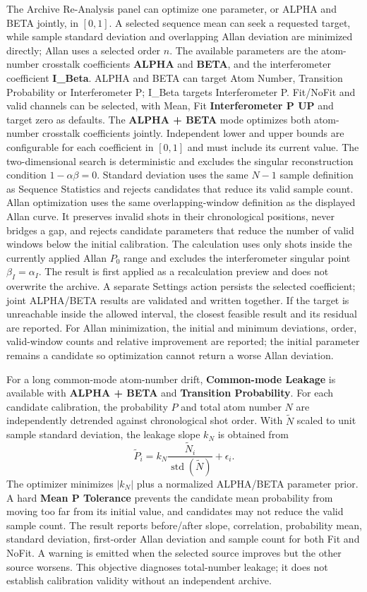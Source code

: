 \documentclass[11pt,oneside,openany]{book}
\newcommand{\ui}[1]{\textbf{#1}}
\begin{document}
The Archive Re-Analysis panel can optimize one parameter, or ALPHA and BETA jointly, in
$[0,1]$. A selected sequence
mean can seek a requested target, while sample standard deviation and overlapping Allan
deviation are minimized directly; Allan uses a selected order $n$. The available parameters are the atom-number
crosstalk coefficients \ui{ALPHA} and \ui{BETA}, and the interferometer coefficient
\ui{I\_Beta}. ALPHA and BETA can target Atom Number, Transition Probability or
Interferometer P; I\_Beta targets Interferometer P. Fit/NoFit and valid channels can be
selected, with Mean, Fit \ui{Interferometer P UP} and target zero as defaults. The
\ui{ALPHA + BETA} mode optimizes both atom-number crosstalk coefficients jointly.
Independent lower and upper bounds are configurable for each coefficient in $[0,1]$ and
must include its current value. The two-dimensional search is deterministic and excludes
the singular reconstruction condition $1-\alpha\beta=0$. Standard deviation uses the same
$N-1$ sample definition as Sequence Statistics and rejects candidates
that reduce its valid sample count. Allan optimization
uses the same overlapping-window definition as the displayed Allan curve. It preserves
invalid shots in their chronological positions, never bridges a gap, and rejects candidate
parameters that reduce the number of valid windows below the initial calibration. The calculation
uses only shots inside the currently applied Allan $P_0$ range and excludes the
interferometer singular point $\beta_I=\alpha_I$. The result is first applied as a
recalculation preview and does not overwrite the archive. A separate Settings action
persists the selected coefficient; joint ALPHA/BETA results are validated and written
together. If the target is unreachable inside the allowed
interval, the closest feasible result and its residual are reported. For Allan minimization,
the initial and minimum deviations, order, valid-window counts and relative improvement are
reported; the initial parameter remains a candidate so optimization cannot return a worse
Allan deviation.

For a long common-mode atom-number drift, \ui{Common-mode Leakage} is available with
\ui{ALPHA + BETA} and \ui{Transition Probability}. For each candidate calibration, the
probability $P$ and total atom number $N$ are independently detrended against chronological
shot order. With $\widetilde N$ scaled to unit sample standard deviation, the leakage slope
$k_N$ is obtained from
\begin{equation}
  \widetilde P_i=k_N\frac{\widetilde N_i}{\operatorname{std}(\widetilde N)}+\epsilon_i.
\end{equation}
The optimizer minimizes $|k_N|$ plus a normalized ALPHA/BETA parameter prior. A hard
\ui{Mean P Tolerance} prevents the candidate mean probability from moving too far from its
initial value, and candidates may not reduce the valid sample count. The result reports
before/after slope, correlation, probability mean, standard deviation, first-order Allan
deviation and sample count for both Fit and NoFit. A warning is emitted when the selected
source improves but the other source worsens. This objective diagnoses total-number
leakage; it does not establish calibration validity without an independent archive.
\end{document}
